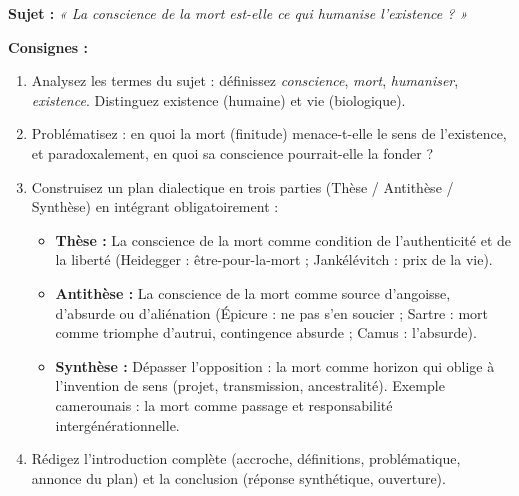\documentclass[11pt]{article}
\begin{document}
\begin{exercice}
\textbf{Sujet :} \emph{« La conscience de la mort est-elle ce qui humanise l'existence ? »}

\vspace{0.3cm}
\noindent \textbf{Consignes :}
\begin{enumerate}
\item Analysez les termes du sujet : définissez \emph{conscience}, \emph{mort}, \emph{humaniser}, \emph{existence}. Distinguez existence (humaine) et vie (biologique).
\item Problématisez : en quoi la mort (finitude) menace-t-elle le sens de l'existence, et paradoxalement, en quoi sa conscience pourrait-elle la fonder ?
\item Construisez un plan dialectique en trois parties (Thèse / Antithèse / Synthèse) en intégrant obligatoirement :
\begin{itemize}
\item \textbf{Thèse :} La conscience de la mort comme condition de l'authenticité et de la liberté (Heidegger : être-pour-la-mort ; Jankélévitch : prix de la vie).
\item \textbf{Antithèse :} La conscience de la mort comme source d'angoisse, d'absurde ou d'aliénation (Épicure : ne pas s'en soucier ; Sartre : mort comme triomphe d'autrui, contingence absurde ; Camus : l'absurde).
\item \textbf{Synthèse :} Dépasser l'opposition : la mort comme horizon qui oblige à l'invention de sens (projet, transmission, ancestralité). Exemple camerounais : la mort comme passage et responsabilité intergénérationnelle.
\end{itemize}
\item Rédigez l'introduction complète (accroche, définitions, problématique, annonce du plan) et la conclusion (réponse synthétique, ouverture).
\end{enumerate}
\end{exercice}
\end{document}
